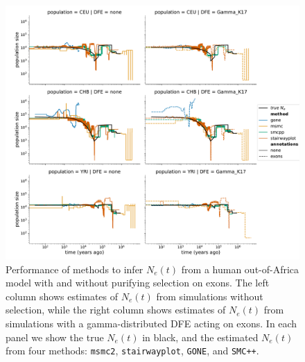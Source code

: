 \documentclass[hidelinks]{article}
\newcommand{\msmc}{\texttt{msmc2}\xspace}
\newcommand{\stairway}{\texttt{stairwayplot}\xspace}
\newcommand{\gone}{\texttt{GONE}\xspace}
\newcommand{\smcpp}{\texttt{SMC++}\xspace}
\begin{document}
    \begin{figure}[t]
        \centering
        \includegraphics[width=\textwidth]{figures/HomSap/OOA/estimated_Ne_t_final}
        \caption{
        \label{fig:1pop-human-demography}
        Performance of methods to infer $N_e(t)$ from a human out-of-Africa model \citep{ragsdale2019models}
        with and without purifying selection on exons. The left column shows estimates of $N_e(t)$ from simulations
        without selection, while the right column shows estimates of $N_e(t)$ from simulations with a gamma-distributed   
        DFE acting on exons. In each panel we show the true $N_e(t)$ in black, and the estimated $N_e(t)$ from four methods:    
        \msmc \citep{Schiffels2020}, \stairway \citep{liu2020stairway}, \gone \citep{santiago2020recent}, and \smcpp \citep{terhorst2017robust}.  
        }
    \end{figure}
\end{document}
